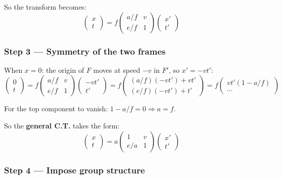 So the transform becomes:
\[
  \begin{pmatrix}x\\t\end{pmatrix}
  = f\begin{pmatrix}a/f & v \\ e/f & 1\end{pmatrix}
  \begin{pmatrix}x'\\t'\end{pmatrix}
\]

\subsubsection*{Step 3 --- Symmetry of the two frames}

When $x=0$: the origin of $F$ moves at speed $-v$ in $F'$, so $x' = -vt'$:
\[
  \begin{pmatrix}0\\t\end{pmatrix}
  = f\begin{pmatrix}a/f & v \\ e/f & 1\end{pmatrix}
    \begin{pmatrix}-vt'\\t'\end{pmatrix}
  = f\begin{pmatrix} (a/f)(-vt') + vt' \\ (e/f)(-vt') + t' \end{pmatrix}
  = f\begin{pmatrix} vt'(1-a/f) \\ \cdots \end{pmatrix}
\]

For the top component to vanish: $1 - a/f = 0 \Rightarrow a = f$.

So the \textbf{general C.T.} takes the form:
\[
  \begin{pmatrix}x\\t\end{pmatrix}
  = a\begin{pmatrix}1 & v \\ e/a & 1\end{pmatrix}
  \begin{pmatrix}x'\\t'\end{pmatrix}
\]

\subsubsection*{Step 4 --- Impose group structure}


